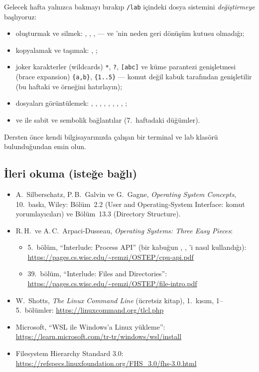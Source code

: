 Gelecek hafta yalnızca bakmayı bırakıp \texttt{\tl/lab} içindeki dosya sistemini \emph{değiştirmeye} başlıyoruz:
\begin{itemize}
  \item oluşturmak ve silmek: , , ,  --- ve 'nin neden geri dönüşüm kutusu olmadığı;
  \item kopyalamak ve taşımak: , ;
  \item joker karakterler (wildcards) \texttt{*}, \texttt{?}, \texttt{[abc]} ve küme parantezi genişletmesi (brace expansion) \texttt{\{a,b\}}, \texttt{\{1..5\}} --- komut değil kabuk tarafından genişletilir (bu haftaki  ve \texttt{\tl} örneğini hatırlayın);
  \item dosyaları görüntülemek: , , , , , , , , ;
  \item {} ve  ile sabit ve sembolik bağlantılar (7.\ haftadaki düğümler).
\end{itemize}
Dersten önce kendi bilgisayarınızda çalışan bir terminal ve lab klasörü bulunduğundan emin olun.

\subsection*{İleri okuma (isteğe bağlı)}
\begin{itemize}
  \item A.\ Silberschatz, P.\,B.\ Galvin ve G.\ Gagne, \emph{Operating System Concepts}, 10.\ baskı, Wiley: Bölüm~2.2 (User and Operating-System Interface: komut yorumlayıcıları) ve Bölüm~13.3 (Directory Structure).
  \item R.\,H.\ ve A.\,C.\ Arpaci-Dusseau, \emph{Operating Systems: Three Easy Pieces}:
  \begin{itemize}
    \item 5.\ bölüm, ``Interlude: Process API'' (bir kabuğun , , 'i nasıl kullandığı): \url{https://pages.cs.wisc.edu/~remzi/OSTEP/cpu-api.pdf}
    \item 39.\ bölüm, ``Interlude: Files and Directories'': \url{https://pages.cs.wisc.edu/~remzi/OSTEP/file-intro.pdf}
  \end{itemize}
  \item W.\ Shotts, \emph{The Linux Command Line} (ücretsiz kitap), 1.\ kısım, 1--5.\ bölümler: \url{https://linuxcommand.org/tlcl.php}
  \item Microsoft, ``WSL ile Windows'a Linux yükleme'': \url{https://learn.microsoft.com/tr-tr/windows/wsl/install}
  \item Filesystem Hierarchy Standard 3.0: \url{https://refspecs.linuxfoundation.org/FHS_3.0/fhs-3.0.html}
\end{itemize}
